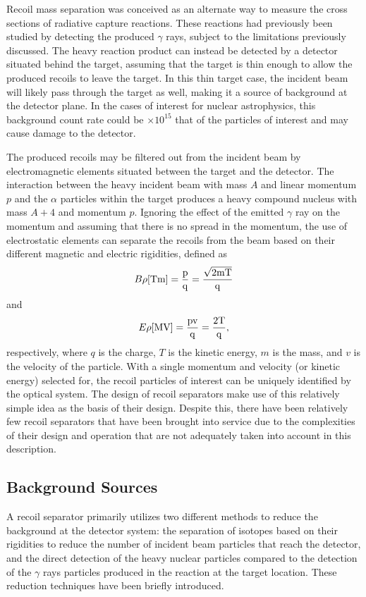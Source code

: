 Recoil mass separation was conceived as an alternate way to measure the cross
sections of radiative capture reactions. These reactions had previously been
studied by detecting the produced $\gamma$ rays, subject to the limitations
previously discussed. The heavy reaction product can instead be detected by a
detector situated behind the target, assuming that the target is thin enough to
allow the produced recoils to leave the target. In this thin target case, the
incident beam will likely pass through the target as well, making it a source
of background at the detector plane. In the cases of interest for nuclear
astrophysics, this background count rate could be $\times 10^{15}$ that of the
particles of interest and may cause damage to the detector.

The produced recoils may be filtered out from the incident beam by
electromagnetic elements situated between the target and the detector. The
interaction between the heavy incident beam with mass $A$ and linear momentum
$p$ and the $\alpha$ particles within
the target produces a heavy compound nucleus with mass $A + 4$ and momentum
$p$. Ignoring the effect of the emitted $\gamma$ ray on the momentum and
assuming that there is no spread in the momentum, the use of electrostatic
elements can separate the recoils from the beam based on their different
magnetic and electric rigidities, defined as
\[
    B\rho\rm{ [Tm] } = \frac{p}{q} = \frac{\sqrt{2mT}}{q}
\]
and
\[
    E\rho\rm{ [MV] } = \frac{pv}{q} = \frac{2T}{q},
\]
respectively, where $q$ is the charge, $T$ is the kinetic energy, $m$ is the
mass, and $v$ is the velocity of the particle. With a single momentum and
velocity (or kinetic energy) selected for, the recoil particles of interest can
be uniquely identified by the optical system. The design of recoil separators
make use of this relatively simple idea as the basis of their design. Despite
this, there have been relatively few recoil separators that have been brought
into service due to the complexities of their design and operation that are not
adequately taken into account in this description.


\subsection{Background Sources}

A recoil separator primarily utilizes two different methods to reduce the
background at the detector system: the separation of isotopes based on their
rigidities to reduce the number of incident beam particles that reach the
detector, and the direct detection of the heavy nuclear particles compared to
the detection of the $\gamma$ rays particles produced in the reaction at the
target location. These reduction techniques have been briefly introduced.

